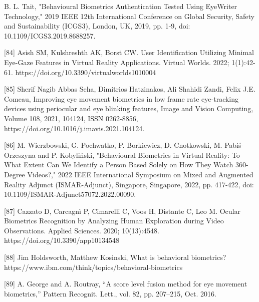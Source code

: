 \documentclass{article}
\begin{document}
\begin{raggedright}
[83] B. L. Tait, "Behavioural Biometrics Authentication Tested Using EyeWriter Technology," 2019 IEEE 12th International Conference on Global Security, Safety and Sustainability (ICGS3), London, UK, 2019, pp. 1-9, doi: 10.1109/ICGS3.2019.8688257.

[84] Asish SM, Kulshreshth AK, Borst CW. User Identification Utilizing Minimal Eye-Gaze Features in Virtual Reality Applications. Virtual Worlds. 2022; 1(1):42-61. https://doi.org/10.3390/virtualworlds1010004

[85] Sherif Nagib Abbas Seha, Dimitrios Hatzinakos, Ali Shahidi Zandi, Felix J.E. Comeau, Improving eye movement biometrics in low frame rate eye-tracking devices using periocular and eye blinking features, Image and Vision Computing, Volume 108, 2021, 104124, ISSN 0262-8856, https://doi.org/10.1016/j.imavis.2021.104124.

[86] M. Wierzbowski, G. Pochwatko, P. Borkiewicz, D. Cnotkowski, M. Pabiś-Orzeszyna and P. Kobyliński, "Behavioural Biometrics in Virtual Reality: To What Extent Can We Identify a Person Based Solely on How They Watch 360-Degree Videos?," 2022 IEEE International Symposium on Mixed and Augmented Reality Adjunct (ISMAR-Adjunct), Singapore, Singapore, 2022, pp. 417-422, doi: 10.1109/ISMAR-Adjunct57072.2022.00090.

[87] Cazzato D, Carcagnì P, Cimarelli C, Voos H, Distante C, Leo M. Ocular Biometrics Recognition by Analyzing Human Exploration during Video Observations. Applied Sciences. 2020; 10(13):4548. https://doi.org/10.3390/app10134548

[88] Jim Holdsworth, Matthew Kosinski, What is behavioral biometrics? https://www.ibm.com/think/topics/behavioral-biometrics

[89] A. George and A. Routray, “A score level fusion method for eye movement biometrics,” Pattern Recognit. Lett., vol. 82, pp. 207–215, Oct. 2016.

\end{raggedright}
\end{document}
